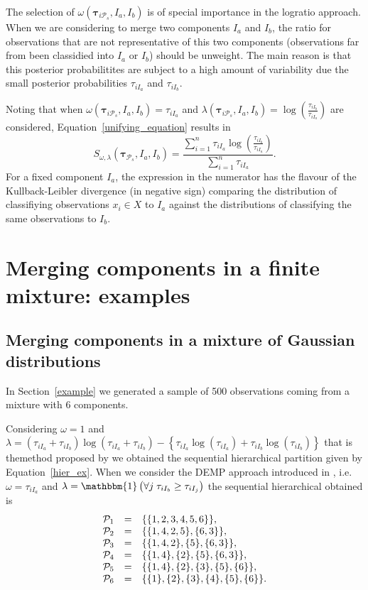 \documentclass[10pt, a4paper]{article}
\newcommand{\m}[1]{\boldsymbol{#1}}
\begin{document}
\begin{spacing}{1.9}
The selection of $\omega(\m\tau_{i \mathcal{P}_s},  I_a,  I_b)$ is of special importance in the logratio approach. When we are considering to merge two components $I_a$ and $I_b$, the ratio for observations that are not representative of this two components (observations far from been classidied into $I_a$ or $I_b$) should be unweight. The main reason is that this posterior probabilitites are subject to a high amount of variability due the small posterior probabilities $\tau_{iI_a}$ and $\tau_{iI_b}$.

Noting that when $\omega(\m\tau_{i \mathcal{P}_s},  I_a,  I_b) =  \tau_{iI_a}$ and $\lambda(\m\tau_{i \mathcal{P}_s},  I_a,  I_b) = \log \left(\frac{ \tau_{iI_b} }{ \tau_{iI_a} }\right)$ are considered, Equation~\ref{unifying_equation} results in
\[
S_{\omega, \lambda}( \m\tau_{\mathcal{P}_s},  I_a,  I_b) = \frac{\sum_{i=1}^n\tau_{iI_a}  \log \left(\frac{ \tau_{iI_b} }{ \tau_{iI_a} }\right)}{\sum_{i=1}^n \tau_{iI_a}}.
\]
For a fixed component $I_a$, the expression in the numerator has the flavour of the Kullback-Leibler divergence (in negative sign) comparing the distribution of classifiying observations $x_i \in X$ to $I_a$ against the distributions of classifying the same observations to $I_b$.

\section{Merging components in a finite mixture: examples}\label{merging_examples_dist}

\subsection{Merging components in a mixture of Gaussian distributions}

In Section~\ref{example} we generated a sample of 500 observations coming from a mixture with 6 components. 


Considering $\omega = 1$ and $\lambda = (\tau_{iI_a}+\tau_{iI_b}) \log(\tau_{iI_a} + \tau_{iI_b}) - \left\{ \tau_{iI_a} \log(\tau_{iI_a}) + \tau_{iI_b} \log(\tau_{iI_b}) \right\}$ that is themethod proposed by \cite{baudry2010combining} we obtained the sequential hierarchical partition given by Equation~\ref{hier_ex}. When we consider  the DEMP approach introduced in \cite{hennig2010methods}, i.e. $\omega = \tau_{i I_a}$ and $\lambda = \mathbbm{1}\left( \forall j\; \tau_{i I_{b}} \geq \tau_{iI_j} \right)$ the sequential hierarchical obtained is
\begin{equation}
\begin{array}{r c l}
\mathcal{P}_1 &=& \{\{1, 2, 3, 4, 5, 6\}\}, \\
\mathcal{P}_2 &=& \{\{1, 4, 2, 5\}, \{6, 3\} \},  \\
\mathcal{P}_3 &=& \{\{1, 4, 2\}, \{5\}, \{6, 3\} \}, \\
\mathcal{P}_4 &=& \{\{1, 4\},\{2\}, \{5\}, \{6, 3\} \}, \\
\mathcal{P}_5 &=& \{\{1, 4\},\{2\}, \{3\},\{5\},\{6\} \},\\
\mathcal{P}_6 &=& \{\{1\},\{2\},\{3\},\{4\},\{5\},\{6\}\}.
\end{array}
\end{equation}


\end{spacing}
\end{document}
